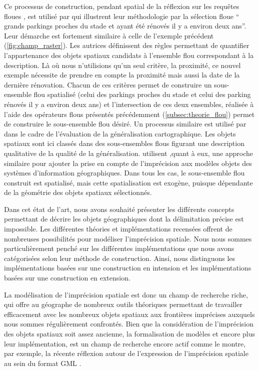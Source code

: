 Ce processus de construction, pendant spatial de la réflexion sur les
requêtes floues \textcite{Wang1994,Moreau2018}, est utilisé par
\textcite{Duraciova2017} qui illustrent leur méthodologie par la
sélection floue \enquote{ grands parkings proches du
  stade et ayant été rénovés il y a environ deux ans}. Leur démarche
est fortement similaire à celle de l’exemple précédent
(\autoref{fig:champ_raster}). Les autrices définissent des règles
permettant de quantifier l’appartenance des objets spatiaux candidats
à l’ensemble flou correspondant à la description. Là où nous
n’utilisions qu’un seul critère, la proximité, ce nouvel exemple
nécessite de prendre en compte la proximité mais aussi la date de la
dernière rénovation. Chacun de ces critères permet de construire un
sous-ensemble flou spatialisé (celui des parkings proches du stade et
celui des parking rénovés il y a environ deux ans) et l’intersection
de ces deux ensembles, réalisée à l’aide des opérateurs flous
présentés précédemment (\autoref{subsec:theorie_flou}) permet de
construire le sous-ensemble flou désiré. Un processus similaire est
utilisé par \textcite{Bard2003} dans le cadre de l’évaluation de la
généralisation cartographique. Les objets spatiaux sont ici classés
dans des sous-ensembles flous figurant une description qualitative de
la qualité de la généralisation. \textcite{Cross2000} utilisent ,quant
à eux, une approche similaire pour ajouter la prise en compte de
l’imprécision aux modèles objets des systèmes d’information
géographiques. Dans tous les cas, le sous-ensemble flou construit est
spatialisé, mais cette spatialisation est exogène, puisque dépendante
de la géométrie des objets spatiaux sélectionnés.


Dans cet état de l’art, nous avons souhaité présenter les différents
concepts permettant de décrire les objets géographiques dont la
délimitation précise est impossible. Les différentes théories et
implémentations recensées offrent de nombreuses possibilités pour
modéliser l’imprécision spatiale. Nous nous sommes particulièrement
penché sur les différentes implémentations que nous avons catégorisées
selon leur méthode de construction. Ainsi, nous distinguons les
implémentations basées sur une construction en intension et les
implémentations basées sur une construction en extension.

La modélisation de l’imprécision spatiale est donc un champ de
recherche riche, qui offre au géographe de nombreux outils théoriques
permettant de travailler efficacement avec les nombreux objets
spatiaux aux frontières imprécises auxquels nous sommes régulièrement
confrontés. Bien que la considération de l’imprécision des objets
spatiaux soit assez ancienne, la formalisation de modèles et encore
plus leur implémentation, est un champ de recherche encore actif comme
le montre, par exemple, la récente réflexion autour de l’expression de
l’imprécision spatiale au sein du format GML \autocite{Wei2017}.



